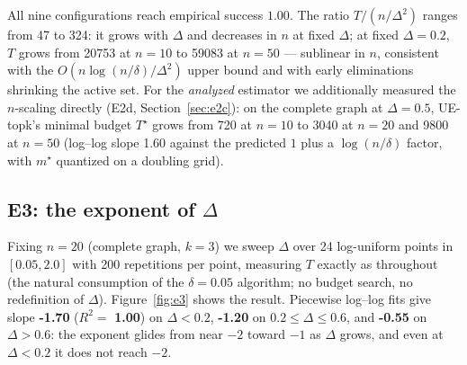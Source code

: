 \documentclass[11pt]{article}
\theoremstyle{definition}
\begin{document}
All nine configurations reach empirical success $1.00$.  The ratio $T/(n/\Delta^2)$ ranges from 47 to 324: it grows with $\Delta$ and decreases in $n$ at fixed $\Delta$; at fixed $\Delta=0.2$, $T$ grows from 20753 at $n=10$ to 59083 at $n=50$ --- sublinear in $n$, consistent with the $O(n\log(n/\delta)/\Delta^2)$ upper bound and with early eliminations shrinking the active set.  For the \emph{analyzed} estimator we additionally measured the $n$-scaling directly (E2d, Section~\ref{sec:e2c}): on the complete graph at $\Delta=0.5$, UE-topk's minimal budget $T^\star$ grows from 720 at $n=10$ to 3040 at $n=20$ and 9800 at $n=50$ (log--log slope 1.60 against the predicted $1$ plus a $\log(n/\delta)$ factor, with $m^\star$ quantized on a doubling grid).

\subsection{E3: the exponent of $\Delta$}
\label{sec:e3}

Fixing $n=20$ (complete graph, $k=3$) we sweep $\Delta$ over 24 log-uniform points in $[0.05, 2.0]$ with 200 repetitions per point, measuring $T$ exactly as throughout (the natural consumption of the $\delta=0.05$ algorithm; no budget search, no redefinition of $\Delta$).  Figure~\ref{fig:e3} shows the result.  Piecewise log--log fits give slope \textbf{-1.70} ($R^2=$ \textbf{1.00}) on $\Delta<0.2$, \textbf{-1.20} on $0.2\le\Delta\le0.6$, and \textbf{-0.55} on $\Delta>0.6$: the exponent glides from near $-2$ toward $-1$ as $\Delta$ grows, and even at $\Delta<0.2$ it does not reach $-2$.
\end{document}
